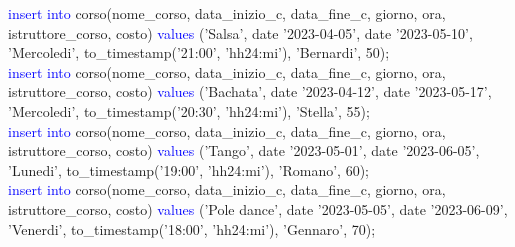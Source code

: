 \documentclass{article}
\begin{document}
\begin{flushleft}
{        \vspace{2mm}
        \hspace*{0.5em}\textcolor{blue}{insert into} corso(nome\_corso, data\_inizio\_c, data\_fine\_c, giorno, ora, \hspace*{0.0em} istruttore\_corso, costo) \textcolor{blue}{values} ('Salsa', date '2023-04-05', date '2023-05-10', \hspace*{0.4em}'Mercoledi', to\_timestamp('21:00', 'hh24:mi'), 'Bernardi', 50); \\
        \vspace{2mm}
        \hspace*{0.5em}\textcolor{blue}{insert into} corso(nome\_corso, data\_inizio\_c, data\_fine\_c, giorno, ora, \hspace*{0.0em} istruttore\_corso, costo) \textcolor{blue}{values} ('Bachata', date '2023-04-12', date \hspace*{0.4em}'2023-05-17', 'Mercoledi', to\_timestamp('20:30', 'hh24:mi'), 'Stella', 55); \\
        \vspace{2mm}
        \hspace*{0.5em}\textcolor{blue}{insert into} corso(nome\_corso, data\_inizio\_c, data\_fine\_c, giorno, ora, \hspace*{0.0em} istruttore\_corso, costo) \textcolor{blue}{values} ('Tango', date '2023-05-01', date '2023-06-05', \hspace*{0.4em}'Lunedi', to\_timestamp('19:00', 'hh24:mi'), 'Romano', 60); \\
        \vspace{2mm}
        \hspace*{0.5em}\textcolor{blue}{insert into} corso(nome\_corso, data\_inizio\_c, data\_fine\_c, giorno, ora, \hspace*{0.0em} istruttore\_corso, costo) \textcolor{blue}{values} ('Pole dance', date '2023-05-05', date \hspace*{0.4em}'2023-06-09', 'Venerdi', to\_timestamp('18:00', 'hh24:mi'), 'Gennaro', 70); \\}
    \end{flushleft}
\end{document}
